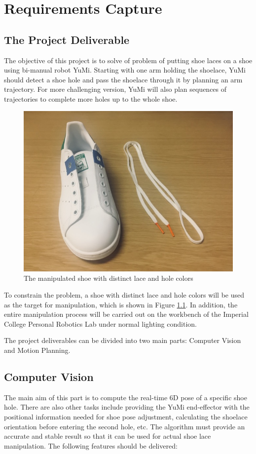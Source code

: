 \chapter{Requirements Capture}

\section{The Project Deliverable}
The objective of this project is to solve of problem of putting shoe laces on a shoe using bi-manual robot YuMi. Starting with one arm holding the shoelace, YuMi should detect a shoe hole and pass the shoelace through it by planning an arm trajectory. For more challenging version, YuMi will also plan sequences of trajectories to complete more holes up to the whole shoe.

\begin{figure}[H]
\centering
\includegraphics[width = 0.5\columnwidth]{RequirementsCap/shoe.jpg}
\caption{The manipulated shoe with distinct lace and hole colors}
\label{shoe}
\end{figure}

To constrain the problem, a shoe with distinct lace and hole colors will be used as the target for manipulation, which is shown in Figure \ref{shoe}. In addition, the entire manipulation process will be carried out on the workbench of the Imperial College Personal Robotics Lab under normal lighting condition.

The project deliverables can be divided into two main parts: Computer Vision and Motion Planning.

\section{Computer Vision}
The main aim of this part is to compute the real-time 6D pose of a specific shoe hole. There are also other tasks include providing the YuMi end-effector with the positional information needed for shoe pose adjustment, calculating the shoelace orientation before entering the second hole, etc. The algorithm must provide an accurate and stable result so that it can be used for actual shoe lace manipulation. The following features should be delivered:

